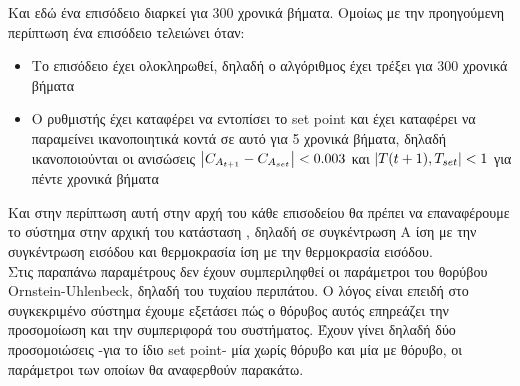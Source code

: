 \documentclass[11pt]{article} %
\numberwithin{equation}{subsection}
\begin{document}
Και εδώ ένα επισόδειο διαρκεί για 300 χρονικά βήματα. Ομοίως με την προηγούμενη περίπτωση ένα επισόδειο τελειώνει όταν:
\begin{itemize}
  \item Το επισόδειο έχει ολοκληρωθεί, δηλαδή ο αλγόριθμος έχει τρέξει για 300 χρονικά βήματα
  \item Ο ρυθμιστής έχει καταφέρει να εντοπίσει το set point και έχει καταφέρει να παραμείνει ικανοποιητικά κοντά σε αυτό για 5 χρονικά βήματα, δηλαδή ικανοποιούνται οι ανισώσεις $\abs{C_{A_{t+1}} - C_{A_{set}}} < 0.003$ και $\abs{T(t+1), T_{set}} < 1$ για πέντε χρονικά βήματα
\end{itemize}

Και στην περίπτωση αυτή στην αρχή του κάθε επισοδείου θα πρέπει να επαναφέρουμε το σύστημα στην αρχική του κατάσταση , δηλαδή σε συγκέντρωση Α ίση με την συγκέντρωση εισόδου και θερμοκρασία ίση με την θερμοκρασία εισόδου.\\

Στις παραπάνω παραμέτρους δεν έχουν συμπεριληφθεί οι παράμετροι του θορύβου Ornstein-Uhlenbeck, δηλαδή του τυχαίου περιπάτου. Ο λόγος είναι επειδή στο συγκεκριμένο σύστημα έχουμε εξετάσει πώς ο θόρυβος αυτός επηρεάζει την προσομοίωση και την συμπεριφορά του συστήματος. Έχουν γίνει δηλαδή δύο προσομοιώσεις -για το ίδιο set point- μία χωρίς θόρυβο και μία με θόρυβο, οι παράμετροι των οποίων θα αναφερθούν παρακάτω.\\
\end{document}
